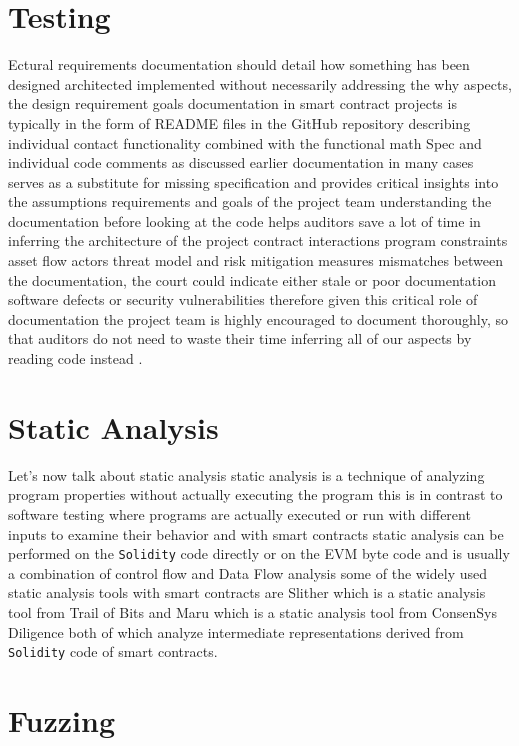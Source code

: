 \section{Testing}

Ectural requirements documentation should detail how something has been designed architected implemented without necessarily addressing the why aspects, the design requirement goals documentation in smart contract projects is typically in the form of README files in the GitHub repository describing individual contact functionality combined with the functional math Spec and individual code comments as discussed earlier documentation in many cases serves as a substitute for missing specification and provides critical insights into the assumptions requirements and goals of the project team understanding the documentation before looking at the code helps auditors save a lot of time in inferring the architecture of the project contract interactions program constraints asset flow actors threat model and risk mitigation measures mismatches between the documentation, the court could indicate either stale or poor documentation software defects or security vulnerabilities therefore given this critical role of documentation the project team is highly encouraged to document thoroughly, so that auditors do not need to waste their time inferring all of our aspects by reading code instead .

\section{Static Analysis}

Let's now talk about static analysis static analysis is a technique of analyzing program properties without actually executing the program this is in contrast to software testing where programs are actually executed or run with different inputs to examine their behavior and with smart contracts static analysis can be performed on the \verb|Solidity| code directly or on the EVM byte code and is usually a combination of control flow and Data Flow analysis some of the widely used static analysis tools with smart contracts are Slither which is a static analysis tool from Trail of Bits and Maru which is a static analysis tool from ConsenSys Diligence both of which analyze intermediate representations derived from \verb|Solidity| code of smart contracts.

\section{Fuzzing}

